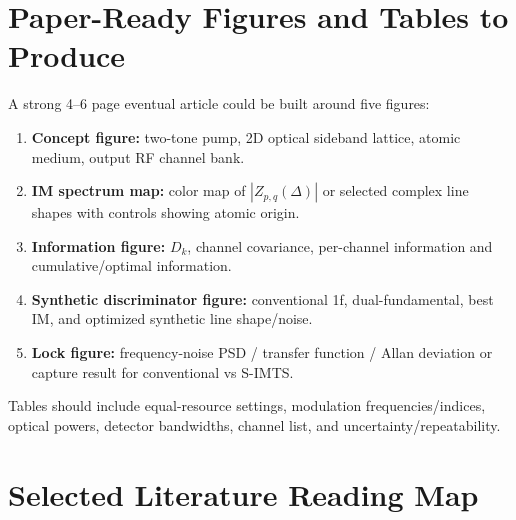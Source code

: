 \documentclass[10pt]{article}
\begin{document}
\section{Paper-Ready Figures and Tables to Produce}

A strong 4--6 page eventual article could be built around five figures:
\begin{enumerate}
\item \textbf{Concept figure:} two-tone pump, 2D optical sideband lattice, atomic medium, output RF channel bank.
\item \textbf{IM spectrum map:} color map of $|Z_{p,q}(\Delta)|$ or selected complex line shapes with controls showing atomic origin.
\item \textbf{Information figure:} $D_k$, channel covariance, per-channel information and cumulative/optimal information.
\item \textbf{Synthetic discriminator figure:} conventional 1f, dual-fundamental, best IM, and optimized synthetic line shape/noise.
\item \textbf{Lock figure:} frequency-noise PSD / transfer function / Allan deviation or capture result for conventional vs S-IMTS.
\end{enumerate}

Tables should include equal-resource settings, modulation frequencies/indices, optical powers, detector bandwidths, channel list, and uncertainty/repeatability.

\section{Selected Literature Reading Map}
\end{document}

